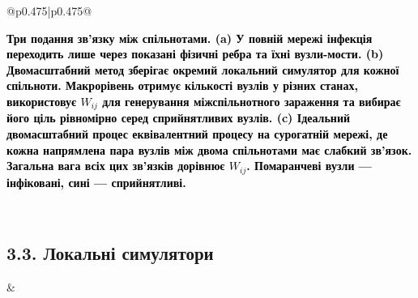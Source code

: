 ﻿\documentclass[11pt]{article}
\begin{document}
\begin{longtable}{@{}p{0.475\textwidth}|p{0.475\textwidth}@{}}
\begin{minipage}[t]{\linewidth}
\begin{minipage}{\linewidth}
\par\small\textbf{\textcolor{black}{Три подання зв'язку між спільнотами. (a) У повній мережі інфекція переходить лише через показані фізичні ребра та їхні вузли-мости. (b) Двомасштабний метод зберігає окремий локальний симулятор для кожної спільноти. Макрорівень отримує кількості вузлів у різних станах, використовує $W_{ij}$ для генерування міжспільнотного зараження та вибирає його ціль рівномірно серед сприйнятливих вузлів. (c) Ідеальний двомасштабний процес еквівалентний процесу на сурогатній мережі, де кожна напрямлена пара вузлів між двома спільнотами має слабкий зв'язок. Загальна вага всіх цих зв'язків дорівнює $W_{ij}$. Помаранчеві вузли --- інфіковані, сині --- сприйнятливі.}}

\end{minipage}\par
\end{minipage} \\[5mm]
\begin{minipage}[t]{\linewidth}
\subsection*{3.3. Локальні симулятори}
\end{minipage} &
\begin{minipage}[t]{\linewidth}

\end{minipage}
\end{longtable}
\end{document}
